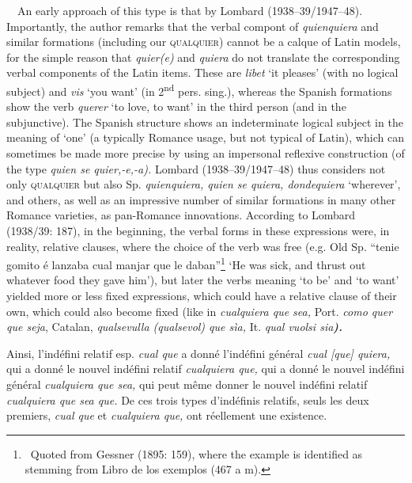 \documentclass[10pt]{article}
\newenvironment{styleStandard}{\renewcommand\baselinestretch{1.25}\setlength\leftskip{0cm}\setlength\rightskip{0cm}\setlength\parindent{0cm}\setlength\parfillskip{0pt plus 1fil}\setlength\parskip{0in plus 1pt}\writerlistparindent\writerlistleftskip\leavevmode\normalfont\normalsize\fontsize{12pt}{14.4pt}\selectfont\writerlistlabel\ignorespaces}{\unskip\vspace{0in plus 1pt}\par}
\newcommand\writerlistleftskip{}
\newcommand\writerlistparindent{}
\newcommand\writerlistlabel{}
\begin{document}
\begin{styleStandard}
\ \ An early approach of this type is that by Lombard (1938–39/1947–48). Importantly, the author remarks that the verbal compont of \textit{quienquiera} and similar formations (including our \textsc{qualquier}) cannot be a calque of Latin models, for the simple reason that \textit{quier(e)} and \textit{quiera }do not translate the corresponding verbal components of the Latin items. These are \textit{libet }‘it pleases’ (with no logical subject) and \textit{vis} ‘you want’ (in 2\textsuperscript{nd} pers. sing.), whereas the Spanish formations show the verb \textit{querer} ‘to love, to want’ in the third person (and in the subjunctive). The Spanish structure shows an indeterminate logical subject in the meaning of ‘one’ (a typically Romance usage, but not typical of Latin), which can sometimes be made more precise by using an impersonal reflexive construction (of the type \textit{quien se quier,\nobreakdash-e,\nobreakdash-a). }Lombard (1938–39/1947–48) thus considers not only \textsc{qualquier}\textit{ }but also Sp. \textit{quienquiera, quien se quiera, dondequiera} ‘wherever’,\textit{ }and others, as well as an impressive number of similar formations in many other Romance varieties, as pan-Romance innovations. According to Lombard (1938/39: 187), in the beginning, the verbal forms in these expressions were, in reality, relative clauses, where the choice of the verb was free (e.g. Old Sp. “tenie gomito é lanzaba cual manjar que le daban”\footnote{\ Quoted from Gessner (1895: 159), where the example is identified as stemming from Libro de los exemplos (467 a m).} ‘He was sick, and thrust out whatever food they gave him’), but later the verbs meaning ‘to be’ and ‘to want’ yielded more or less fixed expressions, which could have a relative clause of their own, which could also become fixed (like in \textit{cualquiera que sea, }Port. \textit{como quer que seja}, Catalan, \textit{qualsevulla (qualsevol) que sìa, }It. \textit{qual vuolsi sia}\textbf{\textit{).}}
\end{styleStandard}

\begin{styleStandard}
Ainsi, l’indéfini relatif esp. \textit{cual que }a donné l’indéfini général \textit{cual [que] quiera, }qui a donné le nouvel indéfini relatif \textit{cualquiera que, }qui a donné le nouvel indéfini général \textit{cualquiera que sea, }qui peut même donner le nouvel indéfini relatif \textit{cualquiera que sea que. }De ces trois types d’indéfinis relatifs, seuls les deux premiers, \textit{cual que }et \textit{cualquiera que, }ont réellement une existence.
\end{styleStandard}
\end{document}
